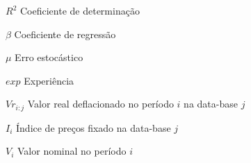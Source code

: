 \begin{simbolos}
  \item[$R^2$] Coeficiente de determinação
  \item[$\beta$] Coeficiente de regressão
  \item[$\mu$] Erro estocástico
  \item[$exp$] Experiência
  \item[$Vr_{i:j}$] Valor real deflacionado no período $i$ na data-base $j$
  \item[$I_i$] Índice de preços fixado na data-base $j$
  \item[$V_i$] Valor nominal no período $i$
\end{simbolos}

\tableofcontents*
\cleardoublepage

\textual
\pagestyle{simple}